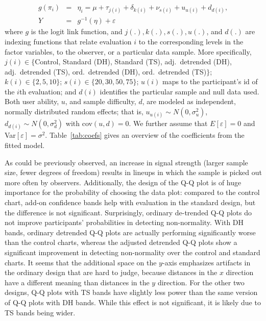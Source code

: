 \documentclass[12pt]{article}\usepackage[]{graphicx}\usepackage[]{color}
\newcommand{\hh}[1]{{\color{magenta} #1}}
\begin{document}
\begin{eqnarray} \label{eq:model}
g(\pi_i) &=& \eta_i = \mu + \tau_{j(i)} +\delta_{k(i)}+ \nu_{s(i)} + u_{u(i)} + d_{d(i)},\\ \nonumber
Y &=& g^{-1}(\eta) + \varepsilon
\end{eqnarray}
where $g$ is the logit link function, and $j(.), k(.), s(.), u(.)$, and $d(.)$ are  indexing functions that relate evaluation $i$ to the corresponding levels in the factor variables, to the observer, or a particular data sample. More specifically, $j(i) \in \{$Control, Standard (DH), Standard (TS), adj.\ detrended (DH), adj.\ detrended (TS), ord.\ detrended (DH), ord.\ detrended (TS)$\}$; $k(i) \in \{2,5,10\}$; $s(i) \in \{20, 30, 50, 75\}$; $u(i)$ maps to the participant's id of the $i$th evaluation; and $d(i)$ identifies the particular sample and null data used. 
Both user ability, $u$, and sample difficulty, $d$, are modeled as independent, normally distributed  random effects; that is, $u_{u(i)} \sim N(0, \sigma_u^2)$, $d_{d(i)} \sim N(0,\sigma_d^2)$ with cov$(u, d) = 0$. We further assume that $E[\varepsilon] = 0$ and Var$[\varepsilon]=\sigma^2$.
%
Table~\ref{tab:coefs} gives an overview of the coefficients from the fitted model.

As could be previously observed, an increase in signal strength (larger sample size, fewer degrees of freedom) results in lineups in which the sample is picked out more often by observers.
Additionally, the design of the Q-Q plot is of huge importance for the probability of choosing the data plot: compared to the control chart, add-on confidence bands help with evaluation in the standard design, but the difference is not significant.  
Surprisingly, ordinary de-trended Q-Q plots do not improve participants' probabilities %
in detecting non-normality. With DH bands, ordinary detrended Q-Q plots are actually performing significantly worse than the control charts,
whereas the adjusted detrended Q-Q plots show a significant improvement in detecting non-normality over the control and standard charts.
It seems that the additional space on the $y$-axis emphasizes artifacts in the ordinary design that are hard to judge, because distances in the $x$ direction have a different meaning than distances in the $y$ direction. %
For the other two designs, Q-Q plots with TS bands have slightly less power than the same version of Q-Q plots with DH bands. While  this effect is not significant, it is likely due to TS bands being wider.
\end{document}

